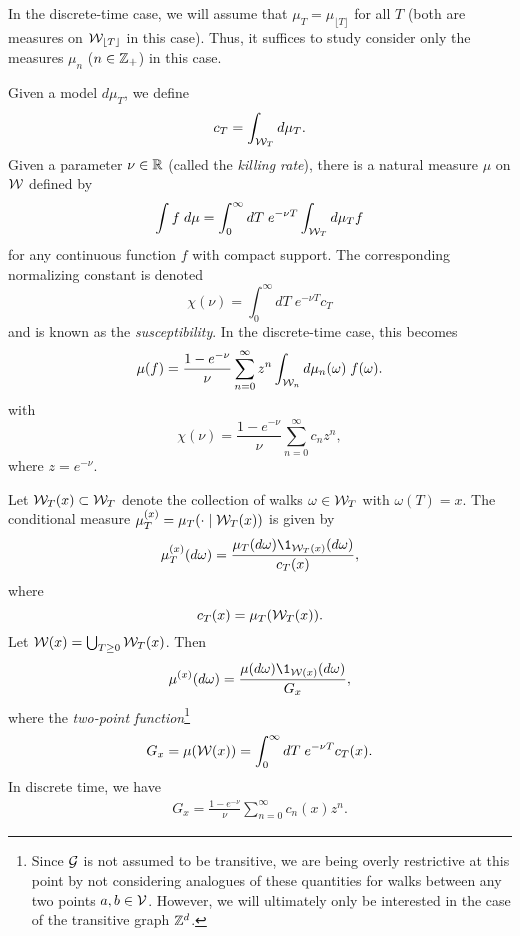 In the discrete-time case, we will assume that
$\mu_T = \mu_{\lfloor T \rfloor}$ for all $T$ (both are measures on
$\mathcal{W}_{\lfloor T \rfloor}$ in this case). Thus, it suffices to study consider only
the measures $\mu_n$ ($n \in {\mathbb Z}_+$) in this case.

Given a model $d\mu_T$, we define
\begin{equation}
c_T = \int_{\mathcal{W}_T} d\mu_T.
\end{equation}
Given a parameter $\nu \in {\mathbb R}$ (called the \emph{killing rate}),
there is a natural measure $\mu$ on $\mathcal{W}$ defined by
\begin{equation}
\int f \; d\mu
  =
\int_0^\infty dT \; e^{-\nu T} \int_{\mathcal{W}_T} d\mu_T f
\end{equation}
for any continuous function $f$ with compact support.
The corresponding normalizing constant is denoted
\begin{equation}
\chi(\nu) = \int_0^\infty dT \; e^{-\nu T} c_T
\end{equation}
and is known as the \emph{susceptibility}. In the discrete-time case, this becomes
\begin{equation}
\mu(f)
  =
\frac{1 - e^{-\nu}}{\nu} \sum_{n=0}^\infty z^n \int_{\mathcal{W}_n} d\mu_n(\omega) \; f(\omega).
\end{equation}
with
\begin{equation}
\chi(\nu) = \frac{1 - e^{-\nu}}{\nu} \sum_{n=0}^\infty c_n z^n,
\end{equation}
where $z = e^{-\nu}$.

Let $\mathcal{W}_T(x) \subset \mathcal{W}_T$ denote the collection of walks $\omega \in \mathcal{W}_T$
with $\omega(T) = x$. The conditional measure $\mu^{(x)}_T = \mu_T(\cdot \mid \mathcal{W}_T(x))$
is given by
\begin{equation}
\mu^{(x)}_T(d\omega) = \frac{\mu_T(d\omega) \1_{\Wcal_T(x)}(d\omega)}{c_T(x)},
\end{equation}
where
\begin{equation}
c_T(x) = \mu_T(\mathcal{W}_T(x)).
\end{equation}
Let $\mathcal{W}(x) = \bigcup_{T \ge 0} \mathcal{W}_T(x)$. Then
\begin{equation}
\mu^{(x)}(d\omega) = \frac{\mu(d\omega) \1_{\Wcal(x)}(d\omega)}{G_x},
\end{equation}
where the \emph{two-point function}\footnote{Since $\mathcal{G}$ is not assumed to be
transitive, we are being overly restrictive at this point by not considering analogues
of these quantities for
walks between any two points $a, b \in \mathcal{V}$. However, we will ultimately
only be interested in the case of the transitive graph ${ {{\mathbb Z}}^d }$.}
\begin{equation}
G_x = \mu(\mathcal{W}(x)) = \int_0^\infty dT \; e^{-\nu T} c_T(x).
\end{equation}
In discrete time, we have
\begin{align}
G_x = \frac{1 - e^{-\nu}}{\nu} \sum_{n=0}^\infty c_n(x) z^n.
\end{align}

